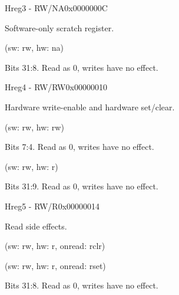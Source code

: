 \documentclass{article}
\begin{document}
\begin{register}{H}{reg3 - RW/NA}{0x0000000C}  \par Software-only scratch register. \regnewline
  \label{reg3}
\regnewline
  \begin{regdesc}\begin{reglist}[field0]
    \item [field0] (sw: rw, hw: na)
    \item [reserved] Bits 31:8. Read as 0, writes have no effect.
  \end{reglist}\end{regdesc}
\end{register}

\begin{register}{H}{reg4 - RW/RW}{0x00000010}  \par Hardware write-enable and hardware set/clear. \regnewline
  \label{reg4}
\regnewline
  \begin{regdesc}\begin{reglist}[field0]
    \item [field0] (sw: rw, hw: rw)
    \item [reserved] Bits 7:4. Read as 0, writes have no effect.
    \item [field1] (sw: rw, hw: r)
    \item [reserved] Bits 31:9. Read as 0, writes have no effect.
  \end{reglist}\end{regdesc}
\end{register}

\begin{register}{H}{reg5 - RW/R}{0x00000014}  \par Read side effects. \regnewline
  \label{reg5}
\regnewline
  \begin{regdesc}\begin{reglist}[field0]
    \item [field0] (sw: rw, hw: r, onread: rclr)
    \item [field1] (sw: rw, hw: r, onread: rset)
    \item [reserved] Bits 31:8. Read as 0, writes have no effect.
  \end{reglist}\end{regdesc}
\end{register}
\end{document}

